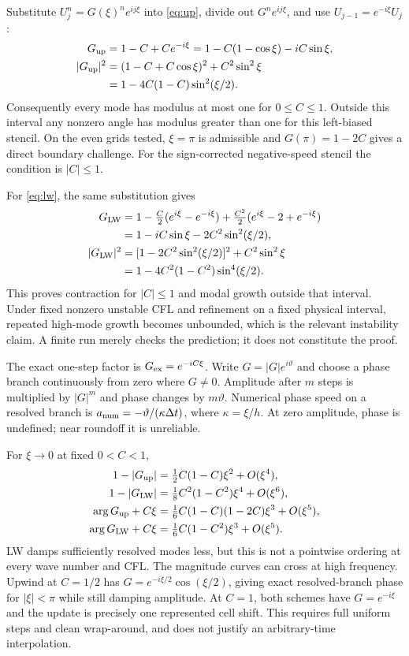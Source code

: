 Substitute $U_j^n=G(\xi)^n e^{ij\xi}$ into \eqref{eq:up}, divide out $G^ne^{ij\xi}$, and use $U_{j-1}=e^{-i\xi}U_j$:
\begin{align}
 G_{\rm up}&=1-C+Ce^{-i\xi}=1-C(1-\cos\xi)-iC\sin\xi,\\
 |G_{\rm up}|^2&=(1-C+C\cos\xi)^2+C^2\sin^2\xi\\
 &=1-4C(1-C)\sin^2(\xi/2).\label{eq:gup}
\end{align}
Consequently every mode has modulus at most one for $0\le C\le1$. Outside this interval any nonzero angle has modulus greater than one for this left-biased stencil. On the even grids tested, $\xi=\pi$ is admissible and $G(\pi)=1-2C$ gives a direct boundary challenge. For the sign-corrected negative-speed stencil the condition is $|C|\le1$.

For \eqref{eq:lw}, the same substitution gives
\begin{align}
 G_{\rm LW}&=1-\tfrac C2(e^{i\xi}-e^{-i\xi})+\tfrac{C^2}{2}(e^{i\xi}-2+e^{-i\xi})\\
 &=1-iC\sin\xi-2C^2\sin^2(\xi/2),\\
 |G_{\rm LW}|^2&=[1-2C^2\sin^2(\xi/2)]^2+C^2\sin^2\xi\\
 &=1-4C^2(1-C^2)\sin^4(\xi/2).\label{eq:glw}
\end{align}
This proves contraction for $|C|\le1$ and modal growth outside that interval. Under fixed nonzero unstable CFL and refinement on a fixed physical interval, repeated high-mode growth becomes unbounded, which is the relevant instability claim. A finite run merely checks the prediction; it does not constitute the proof.

The exact one-step factor is $G_{\rm ex}=e^{-iC\xi}$. Write $G=|G|e^{i\vartheta}$ and choose a phase branch continuously from zero where $G\ne0$. Amplitude after $m$ steps is multiplied by $|G|^m$ and phase changes by $m\vartheta$. Numerical phase speed on a resolved branch is $a_{\rm num}=-\vartheta/(\kappa\Delta t)$, where $\kappa=\xi/h$. At zero amplitude, phase is undefined; near roundoff it is unreliable.

For $\xi\to0$ at fixed $0<C<1$,
\begin{align}
 1-|G_{\rm up}|&=\tfrac12 C(1-C)\xi^2+O(\xi^4),\\
 1-|G_{\rm LW}|&=\tfrac18 C^2(1-C^2)\xi^4+O(\xi^6),\\
 \arg G_{\rm up}+C\xi&=\tfrac16 C(1-C)(1-2C)\xi^3+O(\xi^5),\\
 \arg G_{\rm LW}+C\xi&=\tfrac16 C(1-C^2)\xi^3+O(\xi^5).
\end{align}
LW damps sufficiently resolved modes less, but this is not a pointwise ordering at every wave number and CFL. The magnitude curves can cross at high frequency. Upwind at $C=1/2$ has $G=e^{-i\xi/2}\cos(\xi/2)$, giving exact resolved-branch phase for $|\xi|<\pi$ while still damping amplitude. At $C=1$, both schemes have $G=e^{-i\xi}$ and the update is precisely one represented cell shift. This requires full uniform steps and clean wrap-around, and does not justify an arbitrary-time interpolation.

